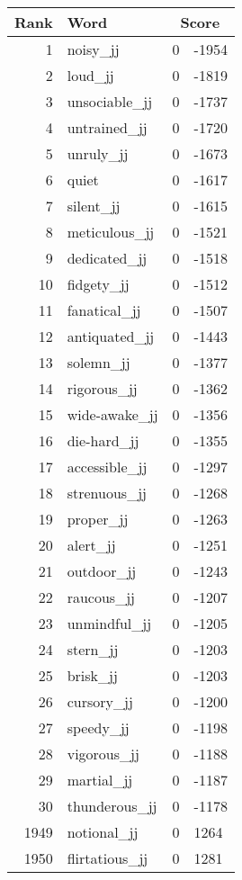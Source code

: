 \begin{longtable}[!htbp]{| rlr@{.}l |}
    \hline
    \textbf{Rank} & \textbf{Word} & \multicolumn{2}{c|}{\textbf{Score}} \\
    \hline
    \endhead
    1 & noisy\_jj & 0 & -1954 \\
    2 & loud\_jj & 0 & -1819 \\
    3 & unsociable\_jj & 0 & -1737 \\
    4 & untrained\_jj & 0 & -1720 \\
    5 & unruly\_jj & 0 & -1673 \\
    6 & quiet & 0 & -1617 \\
    7 & silent\_jj & 0 & -1615 \\
    8 & meticulous\_jj & 0 & -1521 \\
    9 & dedicated\_jj & 0 & -1518 \\
    10 & fidgety\_jj & 0 & -1512 \\
    11 & fanatical\_jj & 0 & -1507 \\
    12 & antiquated\_jj & 0 & -1443 \\
    13 & solemn\_jj & 0 & -1377 \\
    14 & rigorous\_jj & 0 & -1362 \\
    15 & wide-awake\_jj & 0 & -1356 \\
    16 & die-hard\_jj & 0 & -1355 \\
    17 & accessible\_jj & 0 & -1297 \\
    18 & strenuous\_jj & 0 & -1268 \\
    19 & proper\_jj & 0 & -1263 \\
    20 & alert\_jj & 0 & -1251 \\
    21 & outdoor\_jj & 0 & -1243 \\
    22 & raucous\_jj & 0 & -1207 \\
    23 & unmindful\_jj & 0 & -1205 \\
    24 & stern\_jj & 0 & -1203 \\
    25 & brisk\_jj & 0 & -1203 \\
    26 & cursory\_jj & 0 & -1200 \\
    27 & speedy\_jj & 0 & -1198 \\
    28 & vigorous\_jj & 0 & -1188 \\
    29 & martial\_jj & 0 & -1187 \\
    30 & thunderous\_jj & 0 & -1178 \\
    1949 & notional\_jj & 0 & 1264 \\
    1950 & flirtatious\_jj & 0 & 1281 \\

\end{longtable}
